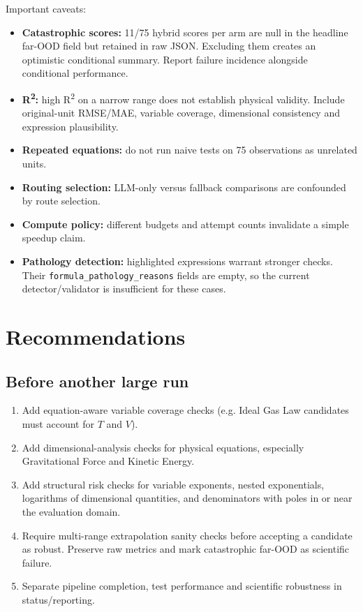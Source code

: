 \documentclass[11pt,a4paper]{article}
\begin{document}
Important caveats:
\begin{itemize}
\item \textbf{Catastrophic scores:} 11/75 hybrid scores per arm are null in the headline far-OOD field but retained in raw JSON. Excluding them creates an optimistic conditional summary. Report failure incidence alongside conditional performance.
\item \textbf{R\textsuperscript{2}:} high R\textsuperscript{2} on a narrow range does not establish physical validity. Include original-unit RMSE/MAE, variable coverage, dimensional consistency and expression plausibility.
\item \textbf{Repeated equations:} do not run naive tests on 75 observations as unrelated units.
\item \textbf{Routing selection:} LLM-only versus fallback comparisons are confounded by route selection.
\item \textbf{Compute policy:} different budgets and attempt counts invalidate a simple speedup claim.
\item \textbf{Pathology detection:} highlighted expressions warrant stronger checks. Their \texttt{formula\_pathology\_reasons} fields are empty, so the current detector/validator is insufficient for these cases.
\end{itemize}

\section{Recommendations}
\subsection{Before another large run}
\begin{enumerate}
\item Add equation-aware variable coverage checks (e.g. Ideal Gas Law candidates must account for $T$ and $V$).
\item Add dimensional-analysis checks for physical equations, especially Gravitational Force and Kinetic Energy.
\item Add structural risk checks for variable exponents, nested exponentials, logarithms of dimensional quantities, and denominators with poles in or near the evaluation domain.
\item Require multi-range extrapolation sanity checks before accepting a candidate as robust. Preserve raw metrics and mark catastrophic far-OOD as scientific failure.
\item Separate pipeline completion, test performance and scientific robustness in status/reporting.
\end{enumerate}
\end{document}
